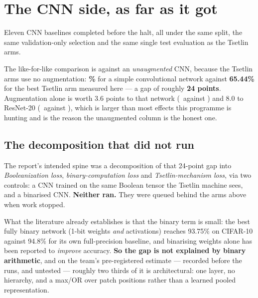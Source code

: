 \section{The CNN side, as far as it got}

Eleven CNN baselines completed before the halt, all under the same split, the same
validation-only selection and the same single test evaluation as the Tsetlin arms.


The like-for-like comparison is against an \emph{unaugmented} CNN, because the Tsetlin arms use no
augmentation: \textbf{\CNNSmallNoaug\%} for a simple convolutional network against \textbf{65.44\%}
for the best Tsetlin arm measured here --- a gap of roughly \textbf{24 points}. Augmentation alone is
worth 3.6 points to that network (\CNNSmall\ against \CNNSmallNoaug) and 8.0 to ResNet-20
(\CNNResnetTwoZero\ against \CNNResnetTwoZeroNoaug), which is larger than most effects this programme is
hunting and is the reason the unaugmented column is the honest one.

\subsection{The decomposition that did not run}
The report's intended spine was a decomposition of that 24-point gap into \emph{Booleanization loss},
\emph{binary-computation loss} and \emph{Tsetlin-mechanism loss}, via two controls: a CNN trained on
the same Boolean tensor the Tsetlin machine sees, and a binarised CNN. \textbf{Neither ran.} They were
queued behind the arms above when work stopped.

What the literature already establishes is that the binary term is small: the best fully binary
network (1-bit weights \emph{and} activations) reaches 93.75\% on CIFAR-10 against 94.8\% for its own
full-precision baseline, and binarising weights alone has been reported to \emph{improve} accuracy.
\textbf{So the gap is not explained by binary arithmetic}, and on the team's pre-registered estimate
--- recorded before the runs, and untested --- roughly two thirds of it is architectural: one layer,
no hierarchy, and a max/OR over patch positions rather than a learned pooled representation.

